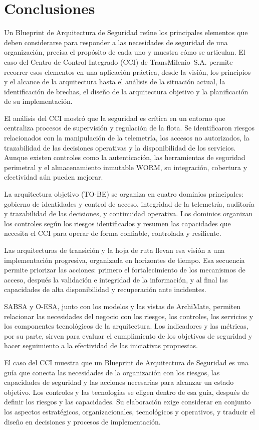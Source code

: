 \section{Conclusiones}

Un Blueprint de Arquitectura de Seguridad reúne los principales elementos que deben considerarse para
responder a las necesidades de seguridad de una organización, precisa el propósito de cada uno y
muestra cómo se articulan. El caso del Centro de Control Integrado (CCI) de TransMilenio~S.A. permite
recorrer esos elementos en una aplicación práctica, desde la visión, los principios y el alcance de la
arquitectura hasta el análisis de la situación actual, la identificación de brechas, el diseño de la
arquitectura objetivo y la planificación de su implementación.

El análisis del CCI mostró que la seguridad es crítica en un entorno que centraliza procesos de
supervisión y regulación de la flota. Se identificaron riesgos relacionados con la manipulación de la
telemetría, los accesos no autorizados, la trazabilidad de las decisiones operativas y la
disponibilidad de los servicios. Aunque existen controles como la autenticación, las herramientas de
seguridad perimetral y el almacenamiento inmutable WORM, su integración, cobertura y efectividad aún
pueden mejorar.

La arquitectura objetivo (TO-BE) se organiza en cuatro dominios principales: gobierno de identidades
y control de acceso, integridad de la telemetría, auditoría y trazabilidad de las decisiones, y
continuidad operativa. Los dominios organizan los controles según los riesgos identificados y
resumen las capacidades que necesita el CCI para operar de forma confiable, controlada y resiliente.

Las arquitecturas de transición y la hoja de ruta llevan esa visión a una implementación progresiva,
organizada en horizontes de tiempo. Esa secuencia permite priorizar las acciones: primero el
fortalecimiento de los mecanismos de acceso, después la validación e integridad de la información, y
al final las capacidades de alta disponibilidad y recuperación ante incidentes.

SABSA y O-ESA, junto con los modelos y las vistas de ArchiMate, permiten relacionar las necesidades
del negocio con los riesgos, los controles, los servicios y los componentes tecnológicos de la
arquitectura. Los indicadores y las métricas, por su parte, sirven para evaluar el cumplimiento de
los objetivos de seguridad y hacer seguimiento a la efectividad de las iniciativas propuestas.

El caso del CCI muestra que un Blueprint de Arquitectura de Seguridad es una guía que conecta las
necesidades de la organización con los riesgos, las capacidades de seguridad y las acciones
necesarias para alcanzar un estado objetivo. Los controles y las tecnologías se eligen dentro de esa
guía, después de definir los riesgos y las capacidades. Su elaboración exige considerar en conjunto
los aspectos estratégicos, organizacionales, tecnológicos y operativos, y traducir el diseño en
decisiones y procesos de implementación.
